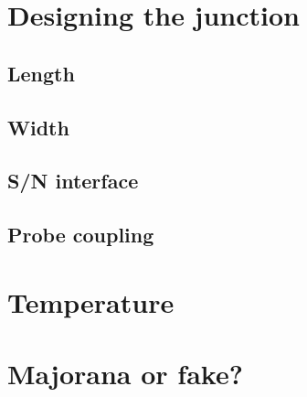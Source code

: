 \section{Designing the junction}
\label{sec:design}

\subsection{Length}
\label{sec:length}

\subsection{Width}
\label{sec:width}

\subsection{S/N interface}
\label{sec:sn}

\subsection{Probe coupling}
\label{sec:probe}

\section{Temperature}
\label{sec:temperature}

\section{Majorana or fake?}
\label{sec:fake}

